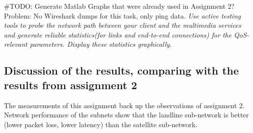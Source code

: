 \documentclass[parskip=full]{scrartcl}
\begin{document}
\#TODO: Generate Matlab Graphs that were already used in Assignment 2?
Problem: No Wireshark dumps for this task, only ping data. 
\textit{Use active testing tools to probe the network path between your client and the multimedia services and generate reliable statistics(for links and end-to-end connections) for the QoS-relevant parameters. Display these statistics graphically.}
\subsection{Discussion of the results, comparing with the results from assignment 2}
The measurements of this assignment back up the observations of assignment 2. 
Network performance of the subnets show that the landline sub-network is better (lower packet loss, lower latency) than the satellite sub-network. 

    
    
    
    
    
    
    
    
    
    
\end{document}
